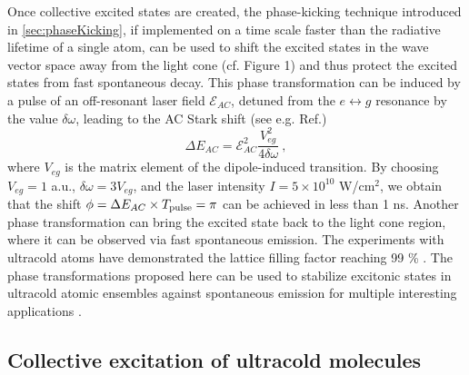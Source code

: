 Once collective excited states are created, the phase-kicking technique introduced in  \autoref{sec:phaseKicking}, 
if implemented on a time scale faster than the radiative lifetime of a single atom, 
can be used to shift the excited states in the wave vector space
away from the light cone (cf. Figure 1) and thus protect the excited states from fast spontaneous decay. This phase transformation can be induced by a pulse of an off-resonant laser field $\mathcal{E}_{AC}$,
detuned from the  $e \leftrightarrow g$ resonance by the value  $\delta\omega$, leading to the
AC Stark shift {(see e.g. Ref.\cite{focusing-books-1})}
\begin{equation}
\Delta E_{AC} =  \mathcal{E}_{AC}^2 \frac{V_{eg}^2}{4 \delta \omega} \ ,
\end{equation}
where $V_{eg}$ is the matrix element of the dipole-induced transition.   By choosing $ V_{eg}= 1$ a.u.,
$\delta \omega = 3 V_{eg}$, and the laser intensity $I = 5\times10^{10}$ W/cm$^2$, we obtain that the shift
 $\phi = \Delta E_{AC} \times T_{\rm pulse} = \pi $ can be achieved in less than 1 ns. 
Another phase transformation can bring the excited state back to the light cone region, where it can be observed via fast spontaneous emission. 
 The experiments with ultracold atoms have demonstrated  the lattice filling factor reaching 99 \%  \cite{atom-mott1, atom-mott2, atom-mott3}.
 The phase transformations proposed here can be used to stabilize excitonic states in ultracold atomic ensembles against spontaneous emission  
for multiple interesting applications \cite{Zoubi1, Zoubi-review}. 


\subsection{Collective excitation of ultracold molecules}
\label{sec:excitationMolecules}

